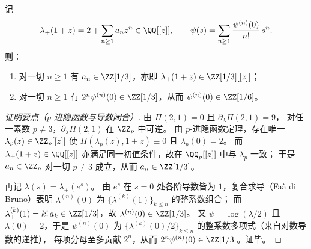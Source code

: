 \begin{conclusion}\label{con:xi-terminal-zm-lambda-plus-3local-denominators}
记
\[
\lambda_+(1+z)=2+\sum_{n\ge 1}a_n z^n\in\QQ[[z]],
\qquad
\psi(s)=\sum_{n\ge 1}\frac{\psi^{(n)}(0)}{n!}\,s^n.
\]
则：
\begin{enumerate}
  \item 对一切 \(n\ge 1\) 有 \(a_n\in\ZZ[1/3]\)，亦即 \(\lambda_+(1+z)\in\ZZ[1/3][[z]]\)；
  \item 对一切 \(n\ge 1\) 有 \(2^n\psi^{(n)}(0)\in\ZZ[1/3]\)，从而 \(\psi^{(n)}(0)\in\ZZ[1/6]\)。
\end{enumerate}
\end{conclusion}
\begin{proof}[证明要点（\(p\)-进隐函数与导数闭合）]
由 \(\Pi(2,1)=0\) 且
\(
\partial_\lambda\Pi(2,1)=9
\)，
对任一素数 \(p\neq3\)，\(\partial_\lambda\Pi(2,1)\) 在 \(\ZZ_p\) 中可逆。
由 \(p\)-进隐函数定理，存在唯一 \(\lambda_p(z)\in\ZZ_p[[z]]\) 使
\(
\Pi(\lambda_p(z),1+z)\equiv0
\)
且 \(\lambda_p(0)=2\)。
而 \(\lambda_+(1+z)\in\QQ[[z]]\) 亦满足同一初值条件，故在 \(\QQ_p[[z]]\) 中与 \(\lambda_p\) 一致；
于是 \(a_n\in\ZZ_p\) 对一切 \(p\neq3\) 成立，从而 \(a_n\in\ZZ[1/3]\)。
\par
再记 \(\lambda(s)=\lambda_+(e^s)\)。
由 \(e^s\) 在 \(s=0\) 处各阶导数皆为 \(1\)，复合求导（Fa\`a di Bruno）表明 \(\lambda^{(n)}(0)\) 为 \(\{\lambda_+^{(k)}(1)\}_{k\le n}\) 的整系数组合；
而 \(\lambda_+^{(k)}(1)=k!\,a_k\in\ZZ[1/3]\)，故 \(\lambda^{(n)}(0)\in\ZZ[1/3]\)。
又 \(\psi=\log(\lambda/2)\) 且 \(\lambda(0)=2\)，于是 \(\psi^{(n)}(0)\) 为 \(\{\lambda^{(k)}(0)/2\}_{k\le n}\) 的整系数多项式（来自对数导数的递推），
每项分母至多贡献 \(2^n\)，从而 \(2^n\psi^{(n)}(0)\in\ZZ[1/3]\)。证毕。
\end{proof}


